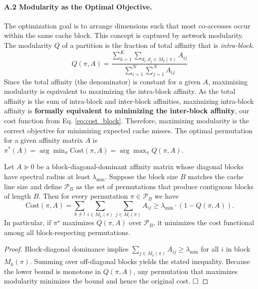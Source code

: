 \documentclass{article}
\begin{document}
\paragraph{A.2 Modularity as the Optimal Objective.}
The optimization goal is to arrange dimensions such that most co-accesses occur within the same cache block. This concept is captured by network modularity. The modularity $Q$ of a partition is the fraction of total affinity that is \textit{intra-block}.
\begin{equation}
    Q(\pi, A) = \frac{\sum_{k=1}^{K} \sum_{d_i, d_j \in M_k(\pi)} A_{ij}}{\sum_{i=1}^{N} \sum_{j=1}^{N} A_{ij}}
\end{equation}
Since the total affinity (the denominator) is constant for a given $A$, maximizing modularity is equivalent to maximizing the intra-block affinity. As the total affinity is the sum of intra-block and inter-block affinities, maximizing intra-block affinity is \textbf{formally equivalent to minimizing the inter-block affinity}, our cost function from Eq. \ref{eq:cost_block}. Therefore, maximizing modularity is the correct objective for minimizing expected cache misses. The optimal permutation for a given affinity matrix $A$ is $\pi^*(A) = \arg\min_{\pi} \text{Cost}(\pi, A) = \arg\max_{\pi} Q(\pi, A)$.

\begin{theorem}
Let $A \succeq 0$ be a block-diagonal-dominant affinity matrix whose diagonal blocks have spectral radius at least $\lambda_{\min}$. Suppose the block size $B$ matches the cache line size and define $\mathcal{P}_B$ as the set of permutations that produce contiguous blocks of length $B$. Then for every permutation $\pi \in \mathcal{P}_B$ we have
\begin{equation}
    \text{Cost}(\pi, A) = \sum_{k \neq l} \sum_{i \in M_k(\pi)} \sum_{j \in M_l(\pi)} A_{ij} \geq \lambda_{\min} \cdot (1 - Q(\pi, A)).
\end{equation}
In particular, if $\pi^{\star}$ maximizes $Q(\pi, A)$ over $\mathcal{P}_B$, it minimizes the cost functional among all block-respecting permutations.
\end{theorem}

\begin{proof}
Block-diagonal dominance implies $\sum_{j \in M_k(\pi)} A_{ij} \geq \lambda_{\min}$ for all $i$ in block $M_k(\pi)$. Summing over off-diagonal blocks yields the stated inequality. Because the lower bound is monotone in $Q(\pi, A)$, any permutation that maximizes modularity minimizes the bound and hence the original cost. $\hfill\square$
\end{proof}
\end{document}
